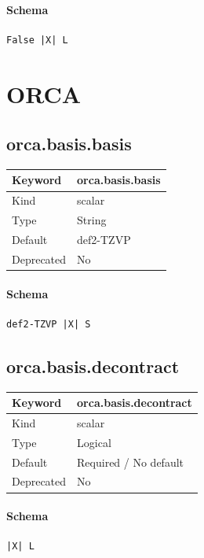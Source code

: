 \documentclass[11pt]{article}
\begin{document}
{{{{{\paragraph{Schema}
\begin{Verbatim}
False |X| L
\end{Verbatim}

\section{ORCA}

\subsection{orca.basis.basis}
\label{kw:orca-basis-basis}
\begin{longtable}{|p{1.5in}|p{4.5in}|}
\hline
Keyword & orca.basis.basis \\
\hline
Kind & scalar \\
\hline
Type & String \\
\hline
Default & def2-TZVP \\
\hline
Deprecated & No \\
\hline
\end{longtable}
\paragraph{Schema}
\begin{Verbatim}
def2-TZVP |X| S
\end{Verbatim}

\subsection{orca.basis.decontract}
\label{kw:orca-basis-decontract}
\begin{longtable}{|p{1.5in}|p{4.5in}|}
\hline
Keyword & orca.basis.decontract \\
\hline
Kind & scalar \\
\hline
Type & Logical \\
\hline
Default & Required / No default \\
\hline
Deprecated & No \\
\hline
\end{longtable}
\paragraph{Schema}
\begin{Verbatim}
|X| L
\end{Verbatim}

}}}}}
\end{document}
